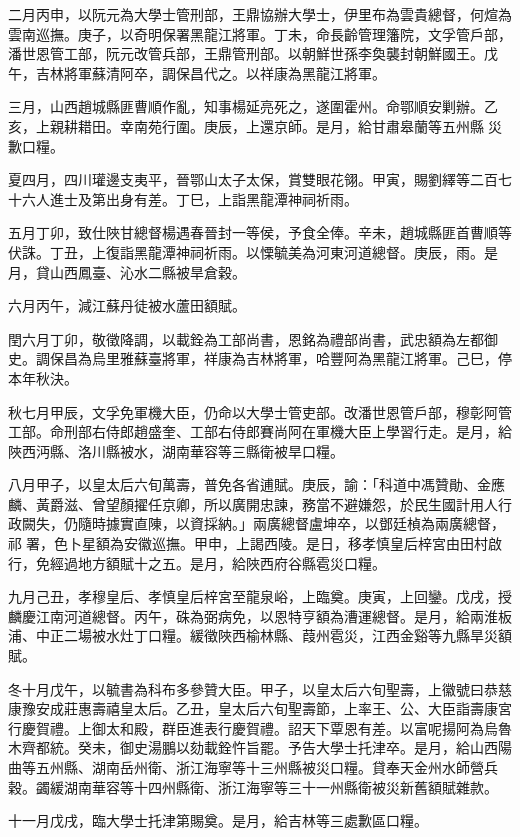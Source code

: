 \begin{pinyinscope}
二月丙申，以阮元為大學士管刑部，王鼎協辦大學士，伊里布為雲貴總督，何煊為雲南巡撫。庚子，以奇明保署黑龍江將軍。丁未，命長齡管理籓院，文孚管戶部，潘世恩管工部，阮元改管兵部，王鼎管刑部。以朝鮮世孫李奐襲封朝鮮國王。戊午，吉林將軍蘇清阿卒，調保昌代之。以祥康為黑龍江將軍。

三月，山西趙城縣匪曹順作亂，知事楊延亮死之，遂圍霍州。命鄂順安剿辦。乙亥，上親耕耤田。幸南苑行圍。庚辰，上還京師。是月，給甘肅皋蘭等五州縣災歉口糧。

夏四月，四川瓘邊支夷平，晉鄂山太子太保，賞雙眼花翎。甲寅，賜劉繹等二百七十六人進士及第出身有差。丁巳，上詣黑龍潭神祠祈雨。

五月丁卯，致仕陜甘總督楊遇春晉封一等侯，予食全俸。辛未，趙城縣匪首曹順等伏誅。丁丑，上復詣黑龍潭神祠祈雨。以慄毓美為河東河道總督。庚辰，雨。是月，貸山西鳳臺、沁水二縣被旱倉穀。

六月丙午，減江蘇丹徒被水蘆田額賦。

閏六月丁卯，敬徵降調，以載銓為工部尚書，恩銘為禮部尚書，武忠額為左都御史。調保昌為烏里雅蘇臺將軍，祥康為吉林將軍，哈豐阿為黑龍江將軍。己巳，停本年秋決。

秋七月甲辰，文孚免軍機大臣，仍命以大學士管吏部。改潘世恩管戶部，穆彰阿管工部。命刑部右侍郎趙盛奎、工部右侍郎賽尚阿在軍機大臣上學習行走。是月，給陜西沔縣、洛川縣被水，湖南華容等三縣衛被旱口糧。

八月甲子，以皇太后六旬萬壽，普免各省逋賦。庚辰，諭：「科道中馮贊勛、金應麟、黃爵滋、曾望顏擢任京卿，所以廣開忠諫，務當不避嫌怨，於民生國計用人行政闕失，仍隨時據實直陳，以資採納。」兩廣總督盧坤卒，以鄧廷楨為兩廣總督，祁署，色卜星額為安徽巡撫。甲申，上謁西陵。是日，移孝慎皇后梓宮由田村啟行，免經過地方額賦十之五。是月，給陜西府谷縣雹災口糧。

九月己丑，孝穆皇后、孝慎皇后梓宮至龍泉峪，上臨奠。庚寅，上回鑾。戊戌，授麟慶江南河道總督。丙午，硃為弼病免，以恩特亨額為漕運總督。是月，給兩淮板浦、中正二場被水灶丁口糧。緩徵陜西榆林縣、葭州雹災，江西金谿等九縣旱災額賦。

冬十月戊午，以毓書為科布多參贊大臣。甲子，以皇太后六旬聖壽，上徽號曰恭慈康豫安成莊惠壽禧皇太后。乙丑，皇太后六旬聖壽節，上率王、公、大臣詣壽康宮行慶賀禮。上御太和殿，群臣進表行慶賀禮。詔天下覃恩有差。以富呢揚阿為烏魯木齊都統。癸未，御史湯鵬以劾載銓忤旨罷。予告大學士托津卒。是月，給山西陽曲等五州縣、湖南岳州衛、浙江海寧等十三州縣被災口糧。貸奉天金州水師營兵穀。蠲緩湖南華容等十四州縣衛、浙江海寧等三十一州縣衛被災新舊額賦雜款。

十一月戊戌，臨大學士托津第賜奠。是月，給吉林等三處歉區口糧。


\end{pinyinscope}
